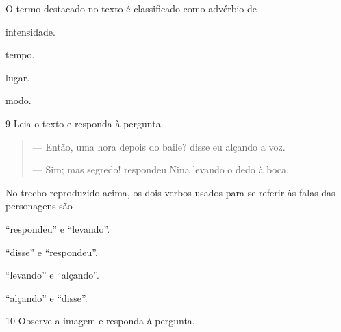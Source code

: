 O termo destacado no texto é classificado como advérbio de

\begin{escolha}
  \item intensidade.

  \item tempo.

  \item lugar.

  \item modo.
\end{escolha}



\num{9} Leia o texto e responda à pergunta.

\begin{quote}
--- Então, uma hora depois do baile? disse eu alçando a voz.

--- Sim; mas segredo! respondeu Nina levando o dedo à boca.

\end{quote}

No trecho reproduzido acima, os dois verbos usados para se referir às
falas das personagens são

\begin{escolha}
  \item ``respondeu'' e ``levando''.

  \item ``disse'' e ``respondeu''.

  \item ``levando'' e ``alçando''.

  \item ``alçando'' e ``disse''.
\end{escolha}



\num{10} Observe a imagem e responda à pergunta.
 
